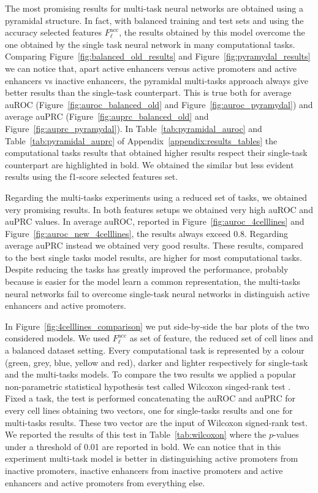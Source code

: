 The most promising results for multi-task neural networks are obtained using a pyramidal structure. In fact, with balanced training and test sets and using the accuracy selected features $F_\ell^{\textrm{acc}}$, the results obtained by this model overcome the one obtained by the single task neural network in many computational tasks. Comparing Figure~\ref{fig:balanced_old_results} and Figure~\ref{fig:pyramydal_results} we can notice that, apart active enhancers versus active promoters and active enhancers vs inactive enhancers, the pyramidal multi-tasks approach always give better results than the single-task counterpart. This is true both for average auROC (Figure~\ref{fig:auroc_balanced_old} and Figure~\ref{fig:auroc_pyramydal}) and average auPRC (Figure~\ref{fig:auprc_balanced_old} and Figure~\ref{fig:auprc_pyramydal}). In Table~\ref{tab:pyramidal_auroc} and Table~\ref{tab:pyramidal_auprc} of Appendix~\ref{appendix:results_tables} the computational tasks results that obtained higher results respect their single-task counterpart are highlighted in bold. We obtained the similar but less evident results using the f1-score selected features set. 

Regarding the multi-tasks experiments using a reduced set of tasks, we obtained very promising results. In both features setups we obtained very high auROC and auPRC values. In average auROC, reported in Figure~\ref{fig:auroc_4celllines} and Figure~\ref{fig:auroc_new_4celllines}, the results always exceed 0.8. Regarding average auPRC instead we obtained very good results. These results, compared to the best single tasks model results, are higher for most computational tasks. Despite reducing the tasks has greatly improved the performance, probably because is easier for the model learn a common representation, the multi-tasks neural networks fail to overcome single-task neural networks in distinguish active enhancers and active promoters. 


In Figure~\ref{fig:4celllines_comparison} we put side-by-side the bar plots of the two considered models. We used $F_\ell^{\textrm{acc}}$ as set of feature, the reduced set of cell lines and a balanced dataset setting. Every computational task is represented by a colour (green, grey, blue, yellow and red), darker and lighter respectively for single-task and the multi-tasks models. 
To compare the two results we applied a popular non-parametric statistical hypothesis test called Wilcoxon singed-rank test \cite{Wilcoxon1945IndividualCB}. Fixed a task, the test is performed concatenating the auROC and auPRC for every cell lines obtaining two vectors, one for single-tasks results and one for multi-tasks results. These two vector are the input of Wilcoxon signed-rank test. We reported the results of this test in Table~\ref{tab:wilcoxon} where the $p$-values under a threshold of 0.01 are reported in bold. We can notice that in this experiment multi-task model is better in distinguishing active promoters from inactive promoters, inactive enhancers from inactive promoters and active enhancers and active promoters from everything else. 

